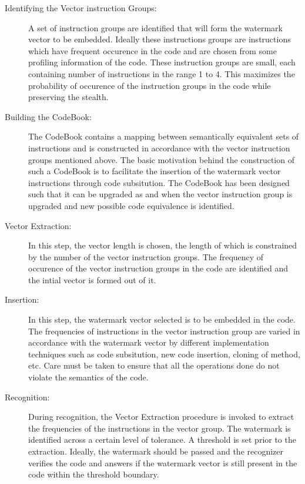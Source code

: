 \begin{description}
   \item[Identifying the Vector instruction Groups: ]
      A set of instruction groups are identified that will form the 
      watermark vector to be embedded. Ideally these instructions groups are instructions 
      which have frequent occurence in the code and are chosen from some 
      profiling information of the code. These instruction groups are 
      small, each containing number of instructions in the range 1 to 4. This
      maximizes the probability of occurence of the instruction groups in the 
      code while preserving the stealth.
   \item[Building the CodeBook: ] 
      The CodeBook contains a mapping between semantically equivalent sets of
      instructions and is constructed in accordance with the vector instruction
      groups mentioned above. The basic motivation behind the construction of
      such a CodeBook is to facilitate the insertion of the watermark vector 
      instructions through code subsitution.  The CodeBook has been designed
      such that it can be upgraded as and when the vector instruction group is
      upgraded and new possible code equivalence is identified.
   \item[Vector Extraction: ] In this step, the vector length is chosen, the 
      length of which is constrained by the number of the vector instruction 
      groups. The frequency of occurence of the vector instruction groups  in 
      the code are identified and the intial vector is formed out of it. 
   \item[Insertion: ] In this step, the watermark vector selected is to be 
      embedded in the code. The frequencies of instructions in the vector 
      instruction group are varied in accordance with the watermark vector by
      different implementation techniques such as code subsitution, new code
      insertion, cloning of method, etc. Care must be taken to ensure that all
      the operations done do not violate the semantics of the code.
   \item[Recognition:] 
      During recognition, the Vector Extraction procedure is invoked to 
      extract the frequencies of the instructions in the vector group. The 
      watermark is identified across a certain level of tolerance. A threshold
      is set prior to the extraction. Ideally, the watermark should be passed
      and the recognizer verifies the code and answers if the watermark vector 
      is still present in the code within the threshold boundary.
\end{description}


